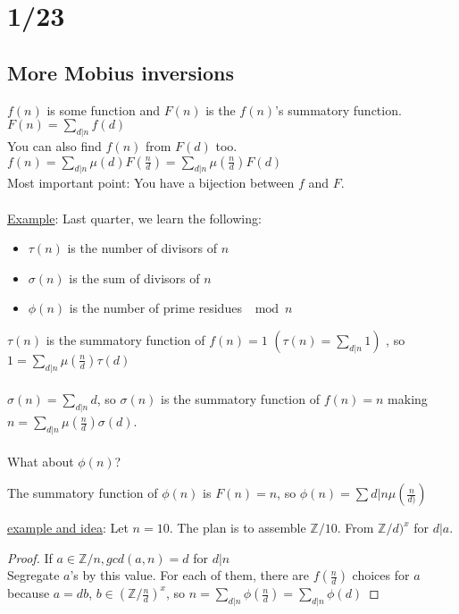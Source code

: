 \section*{1/23}
  \subsection*{More Mobius inversions}
  $f(n)$ is some function and $F(n)$ is the $f(n)$'s summatory function.\\
  $F(n) = \sum_{d|n}f(d)$\\
  You can also find $f(n)$ from $F(d)$ too. $f(n) = \sum_{d|n} \mu(d)F(\frac{n}
  {d}) = \sum_{d|n} \mu(\frac{n}{d}) F(d)$\\
  Most important point: You have a bijection between $f$ and $F$.\\\\
  \underline{Example}: Last quarter, we learn the following:\\
    \begin{itemize}
      \item $\tau(n)$ is the number of divisors of $n$
      \item $\sigma(n)$ is the sum of divisors of $n$
      \item $\phi(n)$ is the number of prime residues $\mod n$
    \end{itemize}
    $\tau(n)$ is the summatory function of $f(n) = 1$ $(\tau(n) = \sum_{d|n}1)$
    , so $1 = \sum_{d | n} \mu(\frac{n}{d}) \tau(d)$\\\\
    $\sigma(n) = \sum_{d |n} d$, so $\sigma(n)$ is the summatory function of 
    $f(n) = n$ making $n = \sum_{d|n} \mu(\frac{n}{d})\sigma(d)$.\\\\
    What about $\phi(n)$?
    \begin{theorem}
      The summatory function of $\phi(n)$ is $F(n) = n$, so
      $\phi(n) = \sum{d|n}\mu(\frac{n}{d)})$
    \end{theorem}
    \underline{example and idea}: Let $n = 10$. The plan is to assemble
    $\mathbb{Z}/10$. From $\mathbb{Z}/d)^x$ for $d | a$.\\
    \begin{proof}
      If $a \in \mathbb{Z}/n, gcd(a,n) = d$ for $d | n$ \\
      Segregate $a$'s by this value. For each of them, there are 
      $f(\frac{n}{d})$ choices for $a$ because $a = db$, $b \in
      (\mathbb{Z}/\frac{n}{d})^x$, so $n = \sum_{d|n} \phi(\frac{n}{d})
      = \sum_{d|n}\phi(d)$
    \end{proof}
